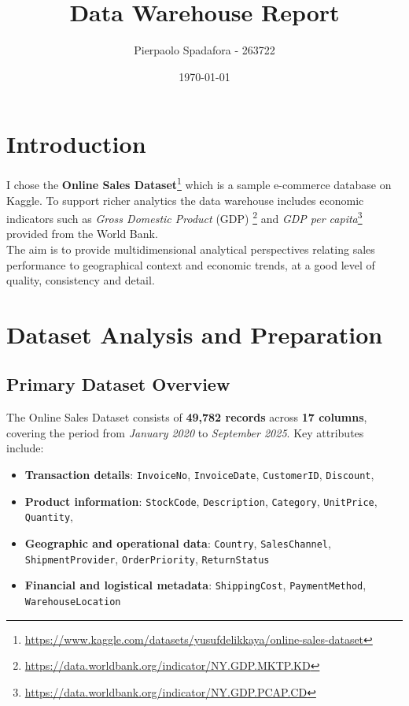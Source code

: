 \documentclass[a4paper,11pt]{article}
\title{Data Warehouse Report}
\author{Pierpaolo Spadafora - 263722}
\date{\today}
\begin{document}
\maketitle

\section{Introduction}

I chose the \textbf{Online Sales Dataset}\footnote{\url{https://www.kaggle.com/datasets/yusufdelikkaya/online-sales-dataset}} which is a sample e-commerce database on Kaggle.
To support richer analytics the data warehouse includes economic indicators such as \textit{Gross Domestic Product} (GDP) \footnote{\url{https://data.worldbank.org/indicator/NY.GDP.MKTP.KD}} and \textit{GDP per capita}\footnote{\url{https://data.worldbank.org/indicator/NY.GDP.PCAP.CD}} provided from the World Bank.\\
The aim is to provide multidimensional analytical perspectives relating sales performance to geographical context and economic trends, at a good level of quality, consistency and detail.

\section{Dataset Analysis and Preparation}
\subsection{Primary Dataset Overview}
The Online Sales Dataset consists of \textbf{49,782 records} across \textbf{17 columns}, covering the period from \textit{January 2020} to \textit{September 2025}. Key attributes include:
\begin{itemize}
    \item \textbf{Transaction details}: \texttt{InvoiceNo}, \texttt{InvoiceDate}, \texttt{CustomerID}, \texttt{Discount},
    \item \textbf{Product information}: \texttt{StockCode}, \texttt{Description}, \texttt{Category}, \texttt{UnitPrice}, \texttt{Quantity},
    \item \textbf{Geographic and operational data}: \texttt{Country}, \texttt{SalesChannel}, \texttt{ShipmentProvider}, \texttt{OrderPriority}, \texttt{ReturnStatus}
    \item \textbf{Financial and logistical metadata}: \texttt{ShippingCost}, \texttt{PaymentMethod}, \texttt{WarehouseLocation}
\end{itemize}
\end{document}
